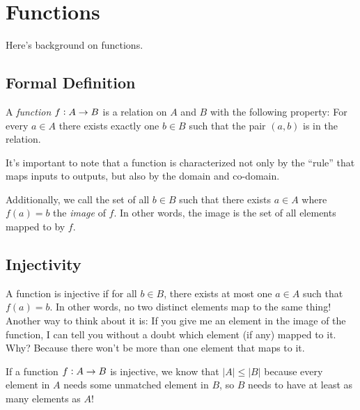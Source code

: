 \documentclass[12pt,letterpaper]{article}
\begin{document}
\section{Functions}

Here's background on functions.

    \subsection{Formal Definition}
    
    A \textit{function} $f \vcentcolon A \rightarrow B$ is a relation on $A$ and $B$ with the following property: For every $a \in A$ there exists exactly one $b\in B$ such that the pair $(a,b)$ is in the relation.
    
    
    It's important to note that a function is characterized not only by the ``rule'' that maps inputs to outputs, but also by the domain and co-domain.
    
    Additionally, we call the set of all $b \in B$ such that there exists $a \in A$ where $f(a) = b$ the \textit{image} of $f$. In other words, the image is the set of all elements mapped to by $f$.
    
    \subsection{Injectivity}

    A function is injective if for all $b \in B$, there exists at most one $a \in A$ such that $f(a) = b$. In other words, no two distinct elements map to the same thing! Another way to think about it is: If you give me an element in the image of the function, I can tell you without a doubt which element (if any) mapped to it. Why? Because there won't be more than one element that maps to it.
    
    If a function $f \vcentcolon A \rightarrow B$ is injective, we know that $|A| \leq |B|$ because every element in $A$ needs some unmatched element in $B$, so $B$ needs to have at least as many elements as $A$!
    
\end{document}
